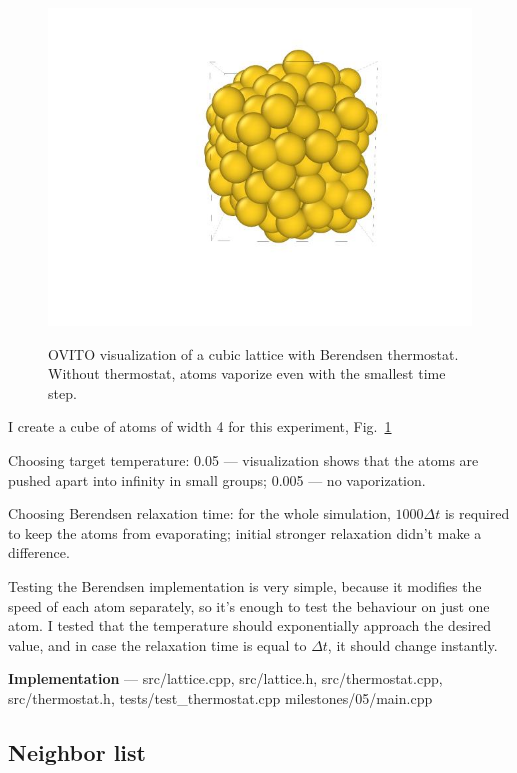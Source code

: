 \documentclass[12pt,a4paper]{article}
\begin{document}
\begin{figure}[htb]
\begin{minipage}{.3\textwidth}
{			\includegraphics[trim={1.8cm 1.8cm 2.2cm 1cm},clip]{img/sim3.jpg}}
	\end{minipage}
	\caption{OVITO visualization of a cubic lattice with Berendsen thermostat. Without thermostat, atoms vaporize even with the smallest time step.}
	\label{fig:first_simulation_ovito}
\end{figure}


I create a cube of atoms of width 4 for this experiment, Fig.~\ref{fig:first_simulation_ovito}

Choosing target temperature: 0.05 --- visualization shows that the atoms are pushed apart into infinity in small groups; 0.005 --- no vaporization.

Choosing Berendsen relaxation time: for the whole simulation, \(1000\Delta t\) is required to keep the atoms from evaporating; initial stronger relaxation didn't make a difference.

Testing the Berendsen implementation is very simple, because it modifies the speed of each atom separately, so it's enough to test the behaviour on just one atom. I tested that the temperature should exponentially approach the desired value, and in case the relaxation time is equal to \(\Delta t\), it should change instantly.

{\bf Implementation} --- src/lattice.cpp, src/lattice.h, src/thermostat.cpp, src/thermostat.h, tests/test\_thermostat.cpp milestones/05/main.cpp

\subsection*{Neighbor list}
\end{document}
